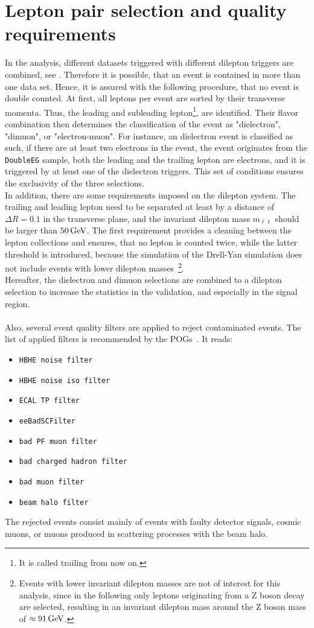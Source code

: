 \section{Lepton pair selection and quality requirements}\label{sec:lepPair}
In the analysis, different datasets triggered with different dilepton triggers are combined, see . Therefore it is possible, that an event is contained in more than one data set. Hence, it is assured with the following procedure, that no event is double counted. At first, all leptons per event are sorted by their transverse momenta. Thus, the leading and subleading lepton\footnote{It is called trailing from now on.}, are identified. Their flavor combination then determines the classification of the event as "dielectron", "dimuon", or "electron-muon". For instance, an dielectron event is classified as such, if there are at least two electrons in the event, the event originates from the \texttt{DoubleEG} sample, both the leading and the trailing lepton are electrons, and it is triggered by at least one of the dielectron triggers. This set of conditions ensures the exclusivity of the three selections.\\
In addition, there are some requirements imposed on the dilepton system. The trailing and leading lepton need to be separated at least by a distance of $\Delta R=0.1$ in the transverse plane, and the invariant dilepton mass $m_{\ell\ell}$ should be larger than $50\,\text{Ge\hspace{-.08em}V}$. The first requirement provides a cleaning between the lepton collections and ensures, that no lepton is counted twice, while the latter threshold is introduced, because the simulation of the Drell-Yan simulation does not include events with lower dilepton masses~\footnote{Events with lower invariant dilepton masses are not of interest for this analysis, since in the following only leptons originating from a Z boson decay are selected, resulting in an invariant dilepton mass around the Z boson mass of $\approx91\,\text{Ge\hspace{-.08em}V}$.}.\\
Hereafter, the dielectron and dimuon selections are combined to a dilepton selection to increase the statistics in the validation, and especially in the signal region.\\
\\
Also, several event quality filters are applied to reject contaminated events. The list of applied filters is recommended by the POGs~\cite{MetFilter}. It reads:
\begin{itemize}
 \item \texttt{HBHE noise filter}
 \item \texttt{HBHE noise iso filter}
 \item \texttt{ECAL TP filter}
 \item \texttt{eeBadSCFilter}
 \item \texttt{bad PF muon filter}
 \item \texttt{bad charged hadron filter}
 \item \texttt{bad muon filter}
 \item \texttt{beam halo filter}
\end{itemize}
The rejected events consist mainly of events with faulty detector signals, cosmic muons, or muons produced in scattering processes with the beam halo.


